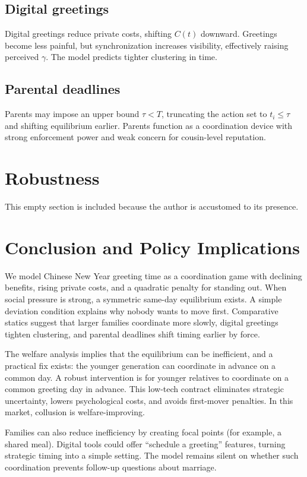 \documentclass[AER]{AEA}
\begin{document}
\subsection{Digital greetings}
Digital greetings reduce private costs, shifting $C(t)$ downward. Greetings become less painful, but synchronization increases visibility, effectively raising perceived $\gamma$. The model predicts tighter clustering in time.

\subsection{Parental deadlines}
Parents may impose an upper bound $\tau<T$, truncating the action set to $t_i\le\tau$ and shifting equilibrium earlier. Parents function as a coordination device with strong enforcement power and weak concern for cousin-level reputation.

\section{Robustness}
This empty section is included because the author is accustomed to its presence.

\section{Conclusion and Policy Implications}
We model Chinese New Year greeting time as a coordination game with declining benefits, rising private costs, and a quadratic penalty for standing out. When social pressure is strong, a symmetric same-day equilibrium exists. A simple deviation condition explains why nobody wants to move first. Comparative statics suggest that larger families coordinate more slowly, digital greetings tighten clustering, and parental deadlines shift timing earlier by force.

The welfare analysis implies that the equilibrium can be inefficient, and a practical fix exists: the younger generation can coordinate in advance on a common day. A robust intervention is for younger relatives to coordinate on a common greeting day in advance. This low-tech contract eliminates strategic uncertainty, lowers psychological costs, and avoids first-mover penalties. In this market, collusion is welfare-improving.

Families can also reduce inefficiency by creating focal points (for example, a shared meal). Digital tools could offer ``schedule a greeting'' features, turning strategic timing into a simple setting. The model remains silent on whether such coordination prevents follow-up questions about marriage.

\FloatBarrier

\nocite{*}


\end{document}
